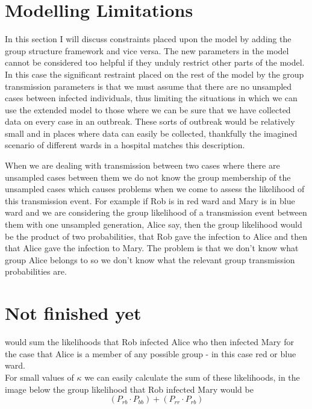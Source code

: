\documentclass[11pt,a4paper]{report}
\begin{document}
\section{Modelling Limitations}
In this section I will discuss constraints placed upon the model by adding the group structure framework and vice versa. The new parameters in the model cannot be considered too helpful if they unduly restrict other parts of the model. In this case the significant restraint placed on the rest of the model by the group transmission parameters is that we must assume that there are no unsampled cases between infected individuals, thus limiting the situations in which we can use the extended model to those where we can be sure that we have collected data on every case in an outbreak. These sorts of outbreak would be relatively small and in places where data can easily be collected, thankfully the imagined scenario of different wards in a hospital matches this description.

When we are dealing with transmission between two cases where there are unsampled cases between them we do not know the group membership of the unsampled cases which causes problems when we come to assess the likelihood of this transmission event. For example if Rob is in red ward and Mary is in blue ward and we are considering the group likelihood of a transmission event between them with one unsampled generation, Alice say, then the group likelihood would be the product of two probabilities, that Rob gave the infection to Alice and then that Alice gave the infection to Mary. The problem is that we don't know what group Alice belongs to so we don't know what the relevant group transmission probabilities are.


\section{Not finished yet}
would sum the likelihoods that Rob infected Alice who then infected Mary for the case that Alice is a member of any possible group - in this case red or blue ward.\\
For small values of $\kappa$ we can easily calculate the sum of these likelihoods, in the image below the group likelihood that Rob infected Mary would be
 \[ (P_{rb} \cdot P_{bb}) + (P_{rr} \cdot P_{rb}) \]
\end{document}
